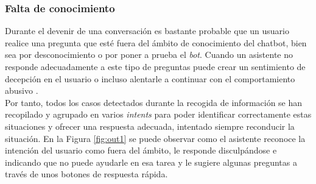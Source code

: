 \subsubsection{Falta de conocimiento}
Durante el devenir de una conversación es bastante probable que un usuario realice una pregunta que esté fuera del ámbito de conocimiento del chatbot, bien sea por desconocimiento o por poner a prueba el \textit{bot}. Cuando un asistente no responde adecuadamente a este tipo de preguntas puede crear un sentimiento de decepción en el usuario o incluso alentarle a continuar con el comportamiento abusivo \cite{shouldInteract}.\\

Por tanto, todos los casos detectados durante la recogida de información se han recopilado y agrupado en varios \textit{intents} para poder identificar correctamente estas situaciones y ofrecer una respuesta adecuada, intentado siempre reconducir la situación. En la Figura \ref{fig:out1} se puede observar como el asistente reconoce la intención del usuario como fuera del ámbito, le responde disculpándose e indicando que no puede ayudarle en esa tarea y le sugiere algunas preguntas a través de unos botones de respuesta rápida.\\

